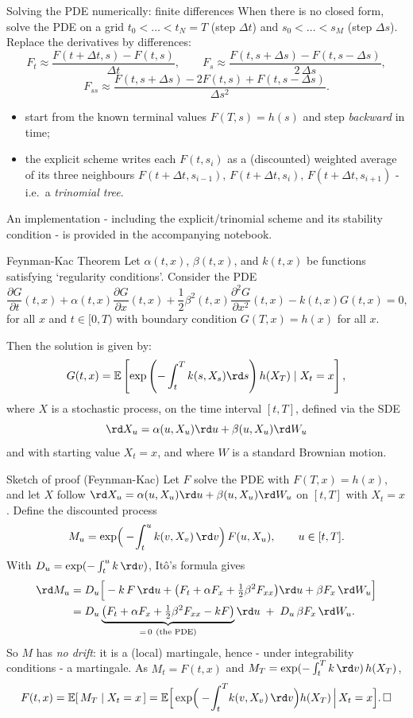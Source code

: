\documentclass[pdf, handout]{beamer}
\begin{document}
\begin{frame}{Solving the PDE numerically: finite differences}
When there is no closed form, solve the PDE on a grid $t_0<\dots<t_N=T$ (step $\Delta t$) and $s_0<\dots<s_M$ (step $\Delta s$). Replace the derivatives by differences:
\[
F_t\approx\frac{F(t+\Delta t,s)-F(t,s)}{\Delta t},\qquad
F_s\approx\frac{F(t,s+\Delta s)-F(t,s-\Delta s)}{2\,\Delta s},
\]
\[
F_{ss}\approx\frac{F(t,s+\Delta s)-2F(t,s)+F(t,s-\Delta s)}{\Delta s^2}.
\]
\begin{itemize}
\item start from the known terminal values $F(T,s)=h(s)$ and step \emph{backward} in time;
\item the explicit scheme writes each $F(t,s_i)$ as a (discounted) weighted average of its three neighbours $F(t+\Delta t,s_{i-1}),\,F(t+\Delta t,s_i),\,F(t+\Delta t,s_{i+1})$ - i.e.\ a \emph{trinomial tree}.
\end{itemize}
An implementation - including the explicit/trinomial scheme and its stability condition - is provided in the accompanying notebook.
\end{frame}

\begin{frame}{Feynman-Kac Theorem}
Let $\alpha(t, x)$, $\beta(t,x)$, and $k(t,x)$ be  functions satisfying `regularity conditions'.
Consider the PDE
\[
\frac{\partial G}{\partial t}(t, x) +  \alpha(t, x) \frac{\partial G}{\partial
x}(t, x) + \frac{1}{2} \beta^2(t,x)  \frac{\partial^2 G}{\partial
x^2}(t,x) - k(t, x)  G(t,x )=0, 
\]
for all $x$ and 
$t\in[0, T)$ with boundary condition $G(T, x) = h(x)$ for all $x$.  

Then the solution is given by:
\[
G(t,x)= \mathbb{E}\left[ 
 \exp\left( -  \int_t^T k(s, X_s) \rd s  \right) h( X_T)
\mid X_t=x
\right],
\]
where $X$ is a stochastic process, on the time interval $[t, T]$, defined via the SDE
\[
\rd X_u = \alpha(u,X_u) \rd u + \beta(u, X_u) \rd W_u
\]
and with starting value $X_t=x$, and
where $W$ is a standard Brownian motion.
\end{frame}



\begin{frame}{Sketch of proof (Feynman-Kac)}
Let $F$ solve the PDE with $F(T,x)=h(x)$, and let $X$ follow $\rd X_u=\alpha(u,X_u)\rd u+\beta(u,X_u)\rd W_u$ on $[t,T]$ with $X_t=x$. Define the discounted process
\[ M_u=\exp\!\Big(-\!\int_t^u k(v,X_v)\,\rd v\Big)\,F(u,X_u),\qquad u\in[t,T]. \]
With $D_u=\exp(-\int_t^u k\,\rd v)$, It\^o's formula gives
\begin{align*}
\rd M_u &= D_u\Big[-k\,F\,\rd u + \big(F_t+\alpha F_x+\tfrac12\beta^2 F_{xx}\big)\rd u + \beta F_x\,\rd W_u\Big]\\
&= D_u\underbrace{\big(F_t+\alpha F_x+\tfrac12\beta^2 F_{xx}-kF\big)}_{=\,0\ \text{(the PDE)}}\rd u \;+\; D_u\,\beta F_x\,\rd W_u .
\end{align*}
So $M$ has \emph{no drift}: it is a (local) martingale, hence - under integrability conditions - a martingale. As $M_t=F(t,x)$ and $M_T=\exp(-\int_t^T k\,\rd v)\,h(X_T)$,
\[ F(t,x)=\mathbb{E}[\,M_T\mid X_t=x\,]=\mathbb{E}\Big[\exp\!\Big(-\!\int_t^T \! k(v,X_v)\,\rd v\Big)h(X_T)\,\Big|\,X_t=x\Big]. \,\square \]
\end{frame}
\end{document}
